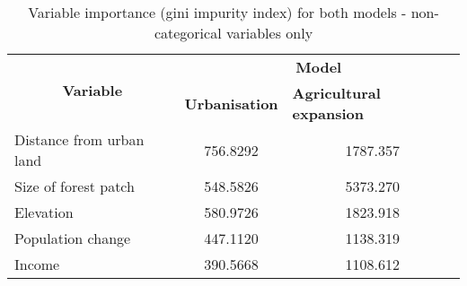 \begin{table}[h!]
\centering
\caption{Variable importance (gini impurity index) for both models - non-categorical variables only}
\label{tab:varimp}
\begin{tabular}{lcc}
\hline
\multicolumn{1}{c}{\multirow{2}{*}{\textbf{Variable}}} & \multicolumn{2}{c}{\textbf{Model}} \\ \cline{2-3} 
\multicolumn{1}{c}{} & \multicolumn{1}{l}{\textbf{Urbanisation}} & \multicolumn{1}{l}{\textbf{Agricultural expansion}} \\ \hline
Distance from urban land & 756.8292 & 1787.357 \\
Size of forest patch & 548.5826 & 5373.270 \\
Elevation & 580.9726 & 1823.918 \\
Population change & 447.1120 & 1138.319 \\
Income & 390.5668 & 1108.612 \\ 
\hline
\end{tabular}
\end{table}
